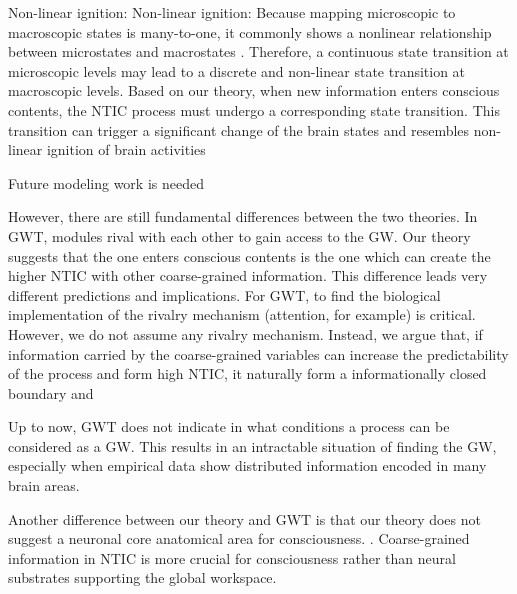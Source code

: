 \documentclass[utf8]{article}
\begin{document}
        
        Non-linear ignition: Non-linear ignition: Because mapping microscopic to macroscopic states is many-to-one, it commonly shows a nonlinear relationship between microstates and macrostates . Therefore, a continuous state transition at microscopic levels may lead to a discrete and non-linear state transition at macroscopic levels. Based on our theory, when new information enters conscious contents, the NTIC process must undergo a corresponding state transition. This transition can trigger a significant change of the brain states and resembles non-linear ignition of brain activities
        
        
        Future modeling work is needed

		However, there are still fundamental differences between the two theories. 
		In GWT, modules rival with each other to gain access to the GW. Our theory suggests that the one enters conscious contents is the one which can create the higher NTIC with other coarse-grained information. This difference leads very different predictions and implications. For GWT, to find the biological implementation of the rivalry mechanism (attention, for example) is critical. However, we do not assume any rivalry mechanism. Instead, we argue that, if  information carried by the coarse-grained variables can increase the predictability of the process and form high NTIC,  it naturally form a informationally closed boundary and 
		
		Up to now, GWT does not indicate in what conditions a process can be considered as a GW. This results in an intractable situation of finding the GW, especially when empirical data show distributed information encoded in many brain areas\citep{siegel2015cortical}. 
		
		Another difference between our theory and GWT is that our theory does not suggest a neuronal core anatomical area for consciousness. . Coarse-grained information in NTIC is more crucial for consciousness rather than neural substrates supporting the global workspace.
		
\end{document}

